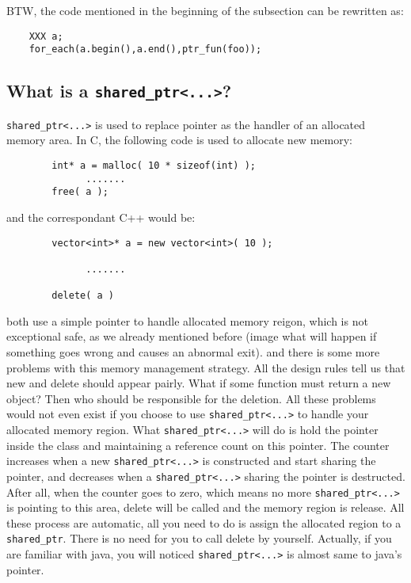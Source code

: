 \documentclass[letterpaper]{book}
\begin{document}
BTW, the code mentioned in the beginning of the subsection can be rewritten as:

\begin{lstlisting}
    XXX a;
    for_each(a.begin(),a.end(),ptr_fun(foo));
\end{lstlisting}

\subsection{What is a \lstinline$shared_ptr<...>$?}
  \lstinline$shared_ptr<...>$ is used to replace pointer as the handler of 
an allocated memory area. In C, the following code is used to allocate new memory:

\begin{lstlisting}
        int* a = malloc( 10 * sizeof(int) );        
              .......
        free( a );
\end{lstlisting}

and the correspondant C++ would be:

\begin{lstlisting}
        vector<int>* a = new vector<int>( 10 );
        
              .......
      
        delete( a )
\end{lstlisting}

both use a simple pointer to handle allocated memory reigon, which is not 
exceptional safe, as we already mentioned before (image what will happen
if something goes wrong and causes an abnormal exit). and there is some 
more problems with this memory management strategy. All the design rules
tell us that new and delete should appear pairly. What if some function
must return a new object? Then who should be responsible for the deletion.
  All these problems would not even exist if you choose to use 
\lstinline$shared_ptr<...>$ 
to handle your allocated memory region. What \lstinline$shared_ptr<...>$ will do is
hold the pointer inside the class and maintaining a reference count on this
pointer. The counter increases when a new \lstinline$shared_ptr<...>$ is constructed and
start sharing the pointer, and decreases when a \lstinline$shared_ptr<...>$ sharing the
pointer is destructed. After all, when the counter goes to zero, which means
no more \lstinline$shared_ptr<...>$ is pointing to this area, delete will be called and
the memory region is release. All these process are automatic, all you need to
do is assign the allocated region to a \lstinline$shared_ptr$. There is no need for you to
call delete by yourself. Actually, if you are familiar with java, you will noticed
\lstinline$shared_ptr<...>$ is almost same to java's pointer.
\end{document}
